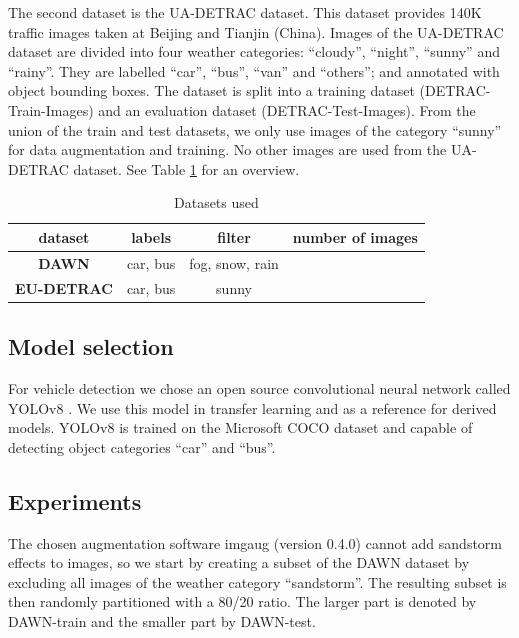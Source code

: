 \documentclass[]{article}
\begin{document}
	The second dataset is the UA-DETRAC \cite{CVIU_UA-DETRAC} dataset. This dataset provides 140K traffic images taken at Beijing and Tianjin (China). Images of the UA-DETRAC dataset are divided into four weather categories: ``cloudy'', ``night'', ``sunny'' and ``rainy''. They are labelled ``car'', ``bus'', ``van'' and ``others''; and annotated with object bounding boxes. The dataset is split into a training dataset (DETRAC-Train-Images) and an evaluation dataset (DETRAC-Test-Images).   From the union of the train and test datasets, we only use images of the category ``sunny'' for data augmentation and training. No other images are used from the UA-DETRAC dataset. See Table \ref{table:datasets} for an overview.
	
	\begin{table}[H]
		\centering
		\begin{tabular}{cccp{1.5in}}
			\toprule
			\textbf{dataset} & \textbf{labels} & \textbf{filter} & \textbf{number of images} \\
			\midrule
			\textbf{DAWN} & car, bus & fog, snow, rain &  \\
			\textbf{EU-DETRAC} & car, bus & sunny &  \\
			\bottomrule
		\end{tabular}
		\caption{Datasets used}
		\label{table:datasets}
	\end{table}

\subsection{Model selection}
 
	For vehicle detection we chose an open source convolutional neural network called YOLO{\small v8} \cite{yolov8_ultralytics}. We use this model in transfer learning and as a reference for derived models. YOLO{\small v8} is trained on the Microsoft COCO dataset \cite{linMicrosoftCOCOCommon2015a} and capable of detecting object categories ``car'' and ``bus''.

\subsection{Experiments}

	The chosen augmentation software imgaug \cite{imgaug} (version 0.4.0) cannot add sandstorm effects to images, so we start by creating a subset of the DAWN dataset by excluding all images of the weather category ``sandstorm''. The resulting subset is then randomly partitioned with a 80/20 ratio. The larger part is denoted by DAWN-train and the smaller part by DAWN-test.
\end{document}
